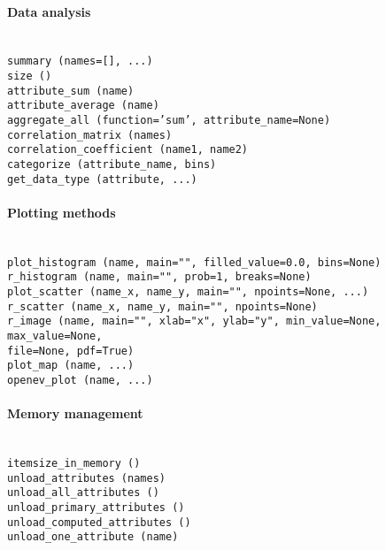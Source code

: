 \paragraph{Data analysis}~\\[1mm]
{\tt summary (names=[], ...)}  \\
{\tt size ()}  \\
{\tt attribute_sum (name)}  \\
{\tt attribute_average (name)}  \\
{\tt aggregate_all (function='sum', attribute_name=None)}  \\
{\tt correlation_matrix (names)}  \\
{\tt correlation_coefficient (name1, name2)}  \\
{\tt categorize (attribute_name, bins)}  \\
{\tt get_data_type (attribute, ...)}

\paragraph{Plotting methods}~\\[1mm]
{\tt plot_histogram (name, main="", filled_value=0.0, bins=None)}  \\
{\tt r_histogram (name, main="", prob=1, breaks=None)}  \\
{\tt plot_scatter (name_x, name_y, main="", npoints=None, ...)}  \\
{\tt r_scatter (name_x, name_y, main="", npoints=None)}  \\
{\tt r_image (name, main="", xlab="x", ylab="y", min_value=None, max_value=None, }\\
\hspace*{3cm} {\tt file=None, pdf=True)}  \\
{\tt plot_map (name, ...)} \\
{\tt openev_plot (name, ...)}

\paragraph{Memory management}~\\[1mm]
{\tt itemsize_in_memory ()}  \\
{\tt unload_attributes (names)}  \\
{\tt unload_all_attributes ()}  \\
{\tt unload_primary_attributes ()}  \\
{\tt unload_computed_attributes ()}  \\
{\tt unload_one_attribute (name)}

